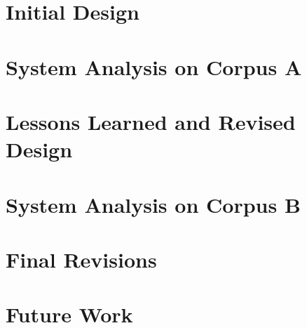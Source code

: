 \documentclass[11pt,letterpaper]{article}
\begin{document}
\section{Initial Design}

\section{System Analysis on Corpus A}

\section{Lessons Learned and Revised Design}

\section{System Analysis on Corpus B}

\section{Final Revisions}

\section{Future Work}








\label{lastpage}
\end{document}
